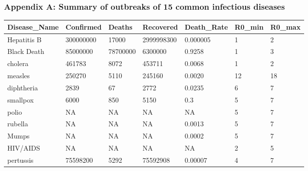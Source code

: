 \documentclass[a4paper, 11pt,twoside=true]{scrartcl}
\begin{document}
\subsubsection*{Appendix A: Summary of outbreaks of 15 common infectious diseases}
\begin{table}[H]
	\begin{tabular}{lllllll}
		\hline
		\textbf{Disease\_Name} & \textbf{Confirmed} & \textbf{Deaths} & \textbf{Recovered} & \textbf{Death\_Rate} & \textbf{R0\_min} & \textbf{R0\_max} \\ \hline
		Hepatitis B            & 300000000          & 17000           & 2999998300         & 0.000005             & 1                & 2                \\
		Black Death            & 85000000           & 78700000        & 6300000            & 0.9258               & 1                & 3                \\
		cholera                & 461783             & 8072            & 453711             & 0.0068               & 1                & 2                \\
		measles                & 250270             & 5110            & 245160             & 0.0020               & 12               & 18               \\
		diphtheria             & 2839               & 67              & 2772               & 0.0235               & 6                & 7                \\
		smallpox               & 6000               & 850             & 5150               & 0.3                  & 5                & 7                \\
		polio                  & NA                 & NA              & NA                 & NA                   & 5                & 7                \\
		rubella                & NA                 & NA              & NA                 & 0.0013               & 5                & 7                \\
		Mumps                  & NA                 & NA              & NA                 & 0.0002               & 5                & 7                \\
		HIV/AIDS               & NA                 & NA              & NA                 & NA                   & 2                & 5                \\
		pertussis              & 75598200           & 5292            & 75592908           & 0.00007              & 4                & 7                \\

\end{tabular}
\end{table}
\end{document}
